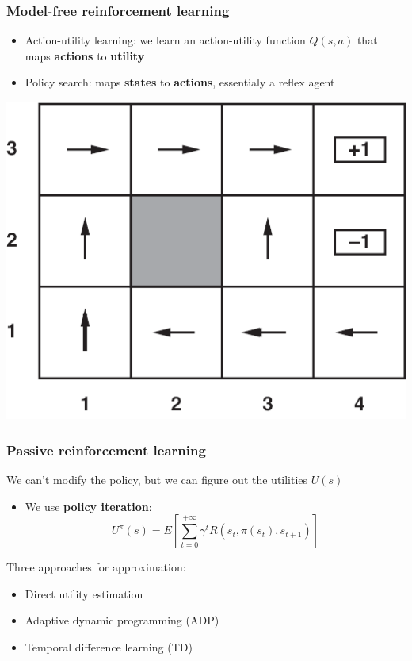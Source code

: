 \documentclass{beamer}
\begin{document}
\begin{frame}
	\frametitle{Model-free reinforcement learning}
	\begin{itemize}
		\item Action-utility learning: we learn an action-utility function $Q(s, a)$ that maps \textbf{actions} to \textbf{utility}
		\item Policy search: maps \textbf{states} to \textbf{actions}, essentialy a reflex agent
	\end{itemize}
	\begin{center}
		\includegraphics[scale=0.8]{figures/optimal-policy-arrows.png}
	\end{center}
\end{frame}

\begin{frame}
	\frametitle{Passive reinforcement learning}
	We can't modify the policy, but we can figure out the utilities $U(s)$
	\begin{itemize}
		\item We use \textbf{policy iteration}:
			$$
				U^\pi(s) = E\left[ \sum_{t=0}^{+\infty} \gamma^t R(s_t, \pi(s_t), s_{t+1}) \right]
			$$
	\end{itemize}
	\pause
	Three approaches for approximation:
	\begin{itemize}
		\item Direct utility estimation
		\item Adaptive dynamic programming (ADP)
		\item Temporal difference learning (TD)
	\end{itemize}
\end{frame}
\end{document}
